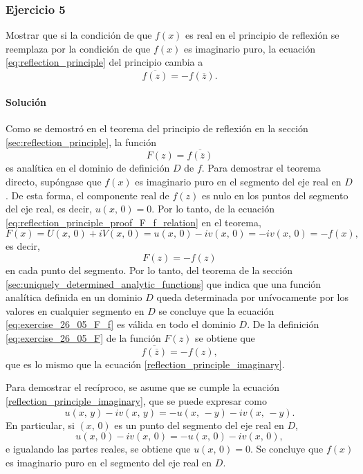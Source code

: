 \documentclass[a4paper]{report}
\begin{document}
\subsubsection{Ejercicio 5}

Mostrar que si la condición de que \(f(x)\) es real en el principio de reflexión se reemplaza por la condición de que \(f(x)\) es imaginario puro, la ecuación \ref{eq:reflection_principle} del principio cambia a 
\begin{equation}\label{reflection_principle_imaginary}
 \overline{f(z)}=-f(\overline{z}).
\end{equation}

\paragraph{Solución} Como se demostró en el teorema del principio de reflexión en la sección \ref{sec:reflection_principle}, la función
\begin{equation}\label{eq:exercise_26_05_F}
 F(z)=\overline{f(\overline{z})}
\end{equation}
es analítica en el dominio de definición \(D\) de \(f\). Para demostrar el teorema directo, supóngase que \(f(x)\) es imaginario puro en el segmento del eje real en \(D\). De esta forma, el componente real de \(f(z)\) es nulo en los puntos del segmento del eje real, es decir, \(u(x,\,0)=0\). Por lo tanto, de la ecuación \ref{eq:reflection_principle_proof_F_f_relation} en el teorema,
\[
 F(x)=U(x,\,0)+iV(x,\,0)=u(x,\,0)-iv(x,\,0)=-iv(x,\,0)=-f(x),
\]
es decir,
\begin{equation}\label{eq:exercise_26_05_F_f}
 F(z)=-f(z)
\end{equation}
en cada punto del segmento. Por lo tanto, del teorema de la sección \ref{sec:uniquely_determined_analytic_functions} que indica que una función analítica definida en un dominio \(D\) queda determinada por unívocamente por los valores en cualquier segmento en \(D\) se concluye que la ecuación \ref{eq:exercise_26_05_F_f} es válida en todo el dominio \(D\). De la definición \ref{eq:exercise_26_05_F} de la función \(F(z)\) se obtiene que
\begin{equation}\label{reflection_principle_imaginary_alt}
 \overline{f(\overline{z})}=-f(z), 
\end{equation}
que es lo mismo que la ecuación \ref{reflection_principle_imaginary}.

Para demostrar el recíproco, se asume que se cumple la ecuación \ref{reflection_principle_imaginary}, que se puede expresar como
\[
 u(x,\,y)-iv(x,\,y)=-u(x,\,-y)-iv(x,\,-y).
\]
En particular, si \((x,\,0)\) es un punto del segmento del eje real en \(D\),
\[
 u(x,\,0)-iv(x,\,0)=-u(x,\,0)-iv(x,\,0),
\]
e igualando las partes reales, se obtiene que \(u(x,\,0)=0\). Se concluye que \(f(x)\) es imaginario puro en el segmento del eje real en \(D\).














\end{document}
